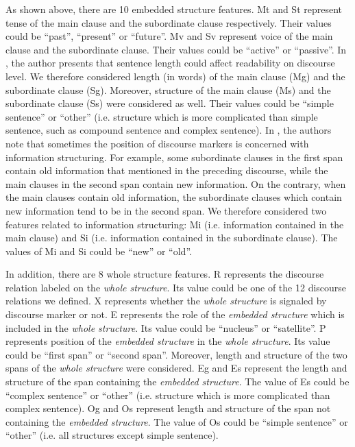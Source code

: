 \documentclass[english]{jnlp_1.3e}
\begin{document}
As shown above, there are 10 embedded structure features. Mt and St represent 
tense of the main clause and the subordinate clause respectively. Their 
values could be ``past'', ``present'' or ``future''. Mv and Sv represent 
voice of the main clause and the subordinate clause. Their values could 
be ``active'' or ``passive''. In \cite{Will03}, the author presents that sentence length
could affect readability on discourse level. We therefore 
considered length (in words) of the main clause (Mg) and the 
subordinate clause (Sg). Moreover, structure of the main clause (Ms) 
and the subordinate clause (Ss) were considered as well. Their 
values could be ``simple sentence'' or ``other'' (i.e. structure
which is more complicated than simple sentence, such as compound 
sentence and complex sentence). In \cite{Biber99}, the authors
note that sometimes the position of discourse markers is concerned with information
structuring. For example, some subordinate clauses in the first span contain
old information that mentioned in the preceding discourse, while the main 
clauses in the second span contain new information. On the contrary, when 
the main clauses contain old information, the subordinate clauses which 
contain new information tend to be in the second span. We therefore 
considered two features related to information structuring: 
Mi (i.e. information contained in the main clause) 
and Si (i.e. information contained in the subordinate clause). 
The values of Mi and Si could be ``new'' or ``old''.  

In addition, there are 8 whole structure features. R represents the
discourse relation labeled on the \textit{whole structure}. Its
value could be one of the 12 discourse relations we defined. X represents whether 
the \textit{whole structure} is signaled by discourse marker or not. 
E represents the role of the \textit{embedded structure} which is included
in the \textit{whole structure}. Its value could be ``nucleus'' or 
``satellite''. P represents position of the \textit{embedded structure} in the 
\textit{whole structure}. Its value could be ``first span'' or ``second span''. 
Moreover, length and structure of the two spans of the \textit{whole structure} 
were considered. Eg and Es represent the length and structure of the 
span containing the \textit{embedded structure}. The value of Es could be 
``complex sentence'' or ``other'' (i.e. structure which is more
complicated than complex sentence). Og and Os represent length and
structure of the span not containing the \textit{embedded structure}. 
The value of Os could be ``simple sentence'' or ``other'' (i.e. all structures
except simple sentence).  
\end{document}
